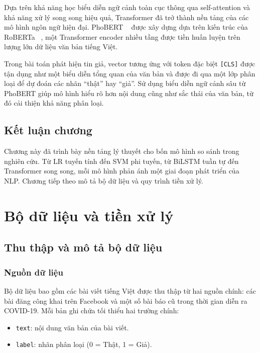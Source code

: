 \documentclass[12pt, a4paper]{report}
\begin{document}
Dựa trên khả năng học biểu diễn ngữ cảnh toàn cục thông qua self-attention và khả năng xử lý song song hiệu quả, Transformer đã trở thành nền tảng của các mô hình ngôn ngữ hiện đại. PhoBERT ~\cite{phobert2020} được xây dựng dựa trên kiến trúc của RoBERTa ~\cite{liu2019roberta}, một Transformer encoder nhiều tầng được tiền huấn luyện trên lượng lớn dữ liệu văn bản tiếng Việt.

Trong bài toán phát hiện tin giả, vector tương ứng với token đặc biệt \texttt{[CLS]} được tận dụng như một biểu diễn tổng quan của văn bản và được đi qua một lớp phân loại để dự đoán các nhãn ``thật'' hay ``giả''. Sử dụng biểu diễn ngữ cảnh sâu từ PhoBERT giúp mô hình hiểu rõ hơn nội dung cũng như sắc thái của văn bản, từ đó cải thiện khả năng phân loại.

\section{Kết luận chương}

Chương này đã trình bày nền tảng lý thuyết cho bốn mô hình so sánh trong nghiên cứu. Từ LR tuyến tính đến SVM phi tuyến, từ BiLSTM tuần tự đến Transformer song song, mỗi mô hình phản ánh một giai đoạn phát triển của NLP. Chương tiếp theo mô tả bộ dữ liệu và quy trình tiền xử lý.

\clearpage


\chapter{Bộ dữ liệu và tiền xử lý}

\section{Thu thập và mô tả bộ dữ liệu}

\subsection{Nguồn dữ liệu}

Bộ dữ liệu bao gồm các bài viết tiếng Việt được thu thập từ hai nguồn chính: các bài đăng công khai trên Facebook và một số bài báo cũ trong thời gian diễn ra COVID-19. Mỗi bản ghi chứa tối thiểu hai trường chính:

\begin{itemize}[leftmargin=2em]
  \item \texttt{text}: nội dung văn bản của bài viết.
  \item \texttt{label}: nhãn phân loại (0 = Thật, 1 = Giả).
\end{itemize}
\end{document}
